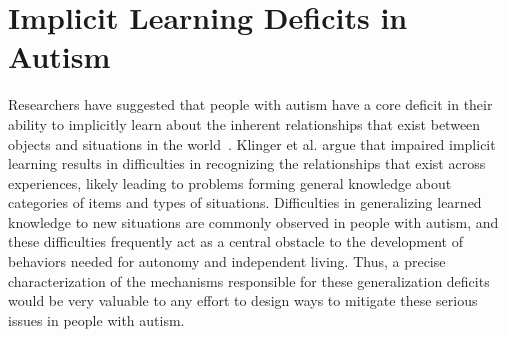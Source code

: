 %
%

\section{Implicit Learning Deficits in Autism}



Researchers have suggested that people with autism have a core deficit in their ability to implicitly learn about the inherent relationships that exist between objects and situations in the world~\cite{RefWorks:148,RefWorks:149}.  Klinger et al. argue that impaired implicit learning results in difficulties in recognizing the relationships that exist across experiences, likely leading to problems forming general knowledge about categories of items and types of situations.  Difficulties in generalizing learned knowledge to new situations are commonly observed in people with autism, and these difficulties frequently act as a central obstacle to the development of behaviors needed for autonomy and independent living.  Thus, a precise characterization of the mechanisms responsible for these generalization deficits would be very valuable to any effort to design ways to mitigate these serious issues in people with autism.

